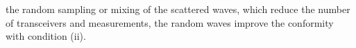 the random sampling
\cite{article:BessonITUFFC2018,proc:BessonICIP2016,article:DavidJASA2015} or
mixing
\cite{article:BessonITUFFC2018,article:LiutkusSciRep2014} of
the scattered waves, which reduce
the number of
transceivers and measurements,
the random waves improve
%
the conformity with
condition (ii).

